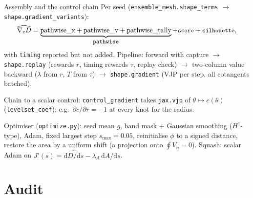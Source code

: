 \documentclass[10pt,aspectratio=169]{beamer}
\newcommand{\dd}{\mathrm{d}}
\newcommand{\code}[1]{\texttt{\small #1}}
\begin{document}
\begin{frame}{Assembly and the control chain}
Per seed (\code{ensemble\_mesh.shape\_terms} $\to$ \code{shape.gradient\_variants}):
\[
\widehat{\nabla_c D} = \underbrace{\text{pathwise\_x} + \text{pathwise\_v} + \text{pathwise\_tally}}_{\code{pathwise}}
+ \code{score} + \code{silhouette},
\]
with \code{timing} reported but not added.
Pipeline: forward with capture $\to$ \code{shape.replay} (rewards $r$, timing rewards $\tau$,
replay check) $\to$ two-column value backward ($\lambda$ from $r$, $T$ from $\tau$) $\to$
\code{shape.gradient} (VJP per step, all cotangents batched).

\medskip
Chain to a scalar control: \code{control\_gradient} takes \code{jax.vjp} of
$\theta\mapsto c(\theta)$ (\code{levelset\_coef}); e.g.\ $\partial c/\partial r = -1$ at every knot
for the radius.

\medskip
Optimiser (\code{optimize.py}): seed mean $g$, band mask + Gaussian smoothing ($H^1$-type),
Adam, fixed largest step $s_{\max} = 0.05$, reinitialise $\phi$ to a signed distance, restore the
area by a uniform shift (a projection onto $\oint V_n = 0$).  Squash: scalar Adam on
$J'(s) = \widehat{\dd D/\dd s} - \lambda_A\,\dd A/\dd s$.
\end{frame}

\section{Audit}
\end{document}
